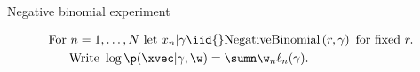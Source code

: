 







\begin{frame}{Negative binomial experiment}

    \begin{align*}
    \textrm{For }n={} 1,\ldots, N \textrm{ let }
        x_n |  \gamma \iid{}& \textrm{NegativeBinomial}\left(r, \gamma \right)
        \textrm{ for fixed }r.\\
    \textrm{Write }\log \p(\xvec \vert \gamma, \w) ={}&
           \sumn \w_n \ell_n(\gamma).
    \end{align*}
    \pause
    \LowDimAccuracyGraph{}
\end{frame}
        




